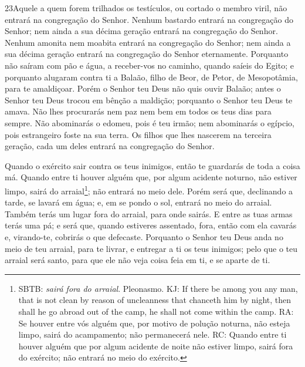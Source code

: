 \medskip

\lettrine{23} Aquele a quem forem trilhados os testículos, ou
cortado o membro viril, não entrará na congregação do Senhor.
Nenhum bastardo entrará na congregação do Senhor; nem ainda a
sua décima geração entrará na congregação do Senhor. Nenhum
amonita nem moabita entrará na congregação do Senhor; nem ainda a
sua décima geração entrará na congregação do Senhor eternamente.
Porquanto não saíram com pão e água, a receber-vos no caminho,
quando saíeis do Egito; e porquanto alugaram contra ti a Balaão,
filho de Beor, de Petor, de Mesopotâmia, para te amaldiçoar.
Porém o Senhor teu Deus não quis ouvir Balaão; antes o Senhor
teu Deus trocou em bênção a maldição; porquanto o Senhor teu Deus te
amava. Não lhes procurarás nem paz nem bem em todos os teus dias
para sempre. Não abominarás o edomeu, pois é teu irmão; nem
abominarás o egípcio, pois estrangeiro foste na sua terra. Os
filhos que lhes nascerem na terceira geração, cada um deles entrará
na congregação do Senhor.

Quando o exército sair contra os teus inimigos, então te guardarás
de toda a coisa má. Quando entre ti houver alguém que, por
algum acidente noturno, não estiver limpo, sairá do
arraial\footnote{SBTB: \emph{sairá fora do arraial}. Pleonasmo. KJ:
If there be among you any man, that is not clean by reason of
uncleanness that chanceth him by night, then shall he go abroad out
of the camp, he shall not come within the camp. RA: Se houver entre
vós alguém que, por motivo de polução noturna, não esteja limpo,
sairá do acampamento; não permanecerá nele. RC: Quando entre ti
houver alguém que por algum acidente de noite não estiver limpo,
sairá fora do exército; não entrará no meio do exército.}; não
entrará no meio dele. Porém será que, declinando a tarde, se
lavará em água; e, em se pondo o sol, entrará no meio do arraial.
Também terás um lugar fora do arraial, para onde sairás.
E entre as tuas armas terás uma pá; e será que, quando
estiveres assentado, fora, então com ela cavarás e, virando-te,
cobrirás o que defecaste. Porquanto o Senhor teu Deus anda no
meio de teu arraial, para te livrar, e entregar a ti os teus
inimigos; pelo que o teu arraial será santo, para que ele não veja
coisa feia em ti, e se aparte de ti.

